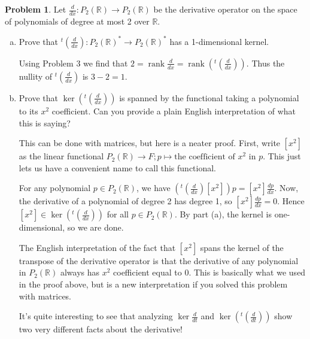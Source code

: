 \documentclass[11pt,oneside]{amsart}
\theoremstyle{definition}
\newtheorem{problem}{Problem}
\newcommand{\bR}{\mathbb{R}}
\newcommand{\eps}{\varepsilon}
\DeclareMathOperator{\rank}{rank}
\begin{document}
    \begin{problem}
        Let $\frac d{dx}\colon P_2(\bR)\to P_2(\bR)$ be the derivative operator on the space of polynomials of degree at most 2 over $\bR$.
        \begin{enumerate}[(a)]
            \item Prove that $^t(\frac d{dx})\colon P_2(\bR)^*\to P_2(\bR)^*$ has a 1-dimensional kernel.
            \begin{solution}
                Using Problem 3 we find that $2=\rank \frac d{dx}=\rank(^t(\frac d{dx}))$. Thus the nullity of $^t(\frac d{dx})$ is $3-2=1$.
            \end{solution}
            \item Prove that $\ker(^t(\frac d{dx}))$ is spanned by the functional taking a polynomial to its $x^2$ coefficient. Can you provide a plain English interpretation of what this is saying?
            \begin{solution}
                This can be done with matrices, but here is a neater proof. First, write $[x^2]$ as the linear functional $P_2(\bR)\to F; p\mapsto \text{the coefficient of }x^2\text{ in }p$. This just lets us have a convenient name to call this functional.
                
                For any polynomial $p\in P_2(\bR)$, we have $(^t(\frac d{dx})[x^2])p=[x^2]\frac{dp}{dx}$. Now, the derivative of a polynomial of degree 2 has degree 1, so $[x^2]\frac{dp}{dx}=0$. Hence $[x^2]\in\ker (^t(\frac d{dx}))$ for all $p\in P_2(\bR)$. By part (a), the kernel is one-dimensional, so we are done.

                The English interpretation of the fact that $[x^2]$ spans the kernel of the transpose of the derivative operator is that the derivative of any polynomial in $P_2(\bR)$ always has $x^2$ coefficient equal to 0. This is basically what we used in the proof above, but is a new interpretation if you solved this problem with matrices.

                It's quite interesting to see that analyzing $\ker\frac d{dt}$ and $\ker(^t(\frac d{dt}))$ show two very different facts about the derivative!
            \end{solution}
        \end{enumerate}
    \end{problem}
\end{document}
